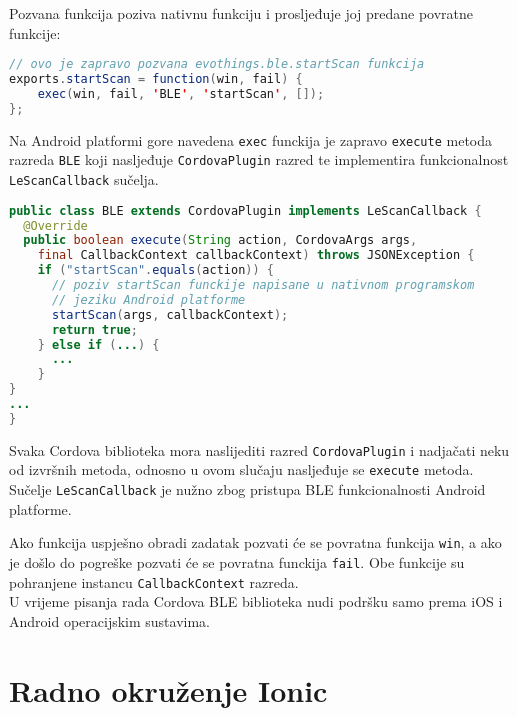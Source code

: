Pozvana funkcija poziva nativnu funkciju i prosljeđuje joj predane povratne funkcije:
\begin{lstlisting}[language=java, morekeywords={var,function}]
// ovo je zapravo pozvana evothings.ble.startScan funkcija
exports.startScan = function(win, fail) {
	exec(win, fail, 'BLE', 'startScan', []);
};
\end{lstlisting}

Na Android platformi gore navedena \texttt{exec} funckija je zapravo \texttt{execute} metoda razreda \texttt{BLE} koji nasljeđuje \texttt{CordovaPlugin} razred te implementira funkcionalnost \texttt{LeScanCallback} sučelja. 
\begin{lstlisting}[language=java]
public class BLE extends CordovaPlugin implements LeScanCallback {
  @Override
  public boolean execute(String action, CordovaArgs args, 
    final CallbackContext callbackContext) throws JSONException {
    if ("startScan".equals(action)) {
      // poziv startScan funckije napisane u nativnom programskom
      // jeziku Android platforme
      startScan(args, callbackContext); 
      return true;
    } else if (...) {
      ...
    }
}
...
}
\end{lstlisting}

Svaka Cordova biblioteka mora naslijediti razred \texttt{CordovaPlugin} i nadjačati neku od   izvršnih metoda, odnosno u ovom slučaju nasljeđuje se \texttt{execute} metoda. 
Sučelje \texttt{LeScanCallback} je nužno zbog pristupa BLE funkcionalnosti Android platforme.

Ako funkcija uspješno obradi zadatak pozvati će se povratna funkcija \texttt{win}, a ako je došlo do pogreške pozvati će se povratna funckija \texttt{fail}. 
Obe funkcije su pohranjene instancu \texttt{CallbackContext} razreda.
\\

U vrijeme pisanja rada Cordova BLE biblioteka nudi podršku samo prema iOS i Android operacijskim sustavima.

\section{Radno okruženje Ionic}

